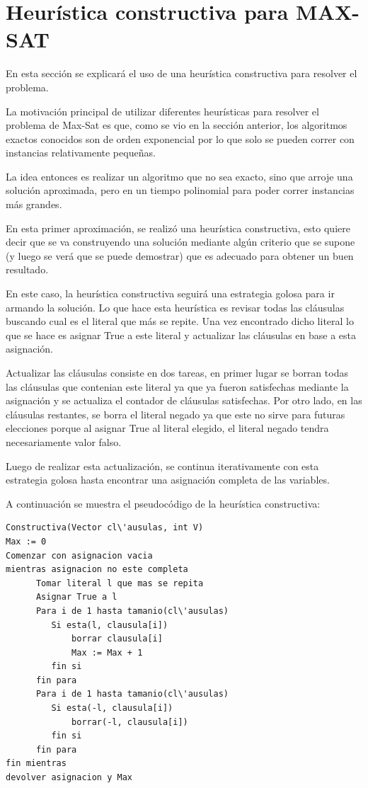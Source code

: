 \documentclass[a4paper,10pt]{article}
\begin{document}
\section*{Heur\'istica constructiva para MAX-SAT}
En esta secci\'on se explicar\'a el uso de una heur\'istica constructiva para resolver el problema.

La motivaci\'on principal de utilizar diferentes heur\'isticas para resolver el problema de Max-Sat es que, como se vio en la secci\'on anterior, los algoritmos exactos conocidos son de orden exponencial por lo que solo se pueden correr con instancias relativamente peque\~{n}as.

La idea entonces es realizar un algoritmo que no sea exacto, sino que arroje una soluci\'on aproximada, pero en un tiempo polinomial para poder correr instancias m\'as grandes.

En esta primer aproximaci\'on, se realiz\'o una heur\'istica constructiva, esto quiere decir que se va construyendo una soluci\'on mediante alg\'un criterio que se supone (y luego se ver\'a que se puede demostrar) que es adecuado para obtener un buen resultado.

En este caso, la heur\'istica constructiva seguir\'a una estrategia golosa para ir armando la soluci\'on. Lo que hace esta heur\'istica es revisar todas las cl\'ausulas buscando cual es el literal que m\'as se repite. Una vez encontrado dicho literal lo que se hace es asignar True a este literal y actualizar las cl\'ausulas en base a esta asignaci\'on.

Actualizar las cl\'ausulas consiste en dos tareas, en primer lugar se borran todas las cl\'ausulas que contenian este literal ya que ya fueron satisfechas mediante la asignaci\'on y se actualiza el contador de cl\'ausulas satisfechas. Por otro lado, en las cl\'ausulas restantes, se borra el literal negado ya que este no sirve para futuras elecciones porque al asignar True al literal elegido, el literal negado tendra necesariamente valor falso.

Luego de realizar esta actualizaci\'on, se continua iterativamente con esta estrategia golosa hasta encontrar una asignaci\'on completa de las variables.

A continuaci\'on se muestra el pseudoc\'odigo de la heur\'istica constructiva:

\begin{verbatim}
Constructiva(Vector cl\'ausulas, int V)
Max := 0
Comenzar con asignacion vacia
mientras asignacion no este completa
      Tomar literal l que mas se repita
      Asignar True a l
      Para i de 1 hasta tamanio(cl\'ausulas)
         Si esta(l, clausula[i])
             borrar clausula[i]
             Max := Max + 1
         fin si
      fin para
      Para i de 1 hasta tamanio(cl\'ausulas)
         Si esta(-l, clausula[i])
             borrar(-l, clausula[i])
         fin si
      fin para
fin mientras
devolver asignacion y Max
\end{verbatim}
\end{document}

